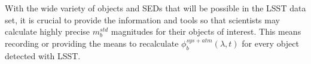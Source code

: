 \documentclass[12pt,preprint]{aastex}
\begin{document}
With the wide variety of objects and SEDs that will be possible in the
LSST data set, it is crucial to provide the information and tools so that
scientists may calculate highly precise $m_b^{std}$ magnitudes for
their objects of interest. This means recording or providing the means
to recalculate $\phi_b^{sys+atm}(\lambda,t)$ for every object detected
with LSST. 










\end{document}
